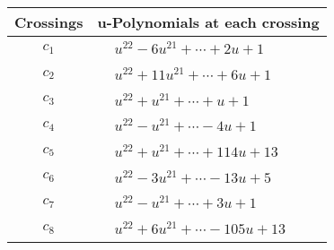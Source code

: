 \documentclass[1p]{elsarticle_modified}
\theoremstyle{definition}
\begin{document}
\begin{tabular}{m{50pt}|m{274pt}}
Crossings & \hspace{64pt}u-Polynomials at each crossing \\
\hline $$\begin{aligned}c_{1}\end{aligned}$$&$\begin{aligned}
&u^{22}-6 u^{21}+\cdots+2 u+1
\end{aligned}$\\
\hline $$\begin{aligned}c_{2}\end{aligned}$$&$\begin{aligned}
&u^{22}+11 u^{21}+\cdots+6 u+1
\end{aligned}$\\
\hline $$\begin{aligned}c_{3}\end{aligned}$$&$\begin{aligned}
&u^{22}+u^{21}+\cdots+u+1
\end{aligned}$\\
\hline $$\begin{aligned}c_{4}\end{aligned}$$&$\begin{aligned}
&u^{22}- u^{21}+\cdots-4 u+1
\end{aligned}$\\
\hline $$\begin{aligned}c_{5}\end{aligned}$$&$\begin{aligned}
&u^{22}+u^{21}+\cdots+114 u+13
\end{aligned}$\\
\hline $$\begin{aligned}c_{6}\end{aligned}$$&$\begin{aligned}
&u^{22}-3 u^{21}+\cdots-13 u+5
\end{aligned}$\\
\hline $$\begin{aligned}c_{7}\end{aligned}$$&$\begin{aligned}
&u^{22}- u^{21}+\cdots+3 u+1
\end{aligned}$\\
\hline $$\begin{aligned}c_{8}\end{aligned}$$&$\begin{aligned}
&u^{22}+6 u^{21}+\cdots-105 u+13
\end{aligned}$\\

\end{tabular}
\end{document}
